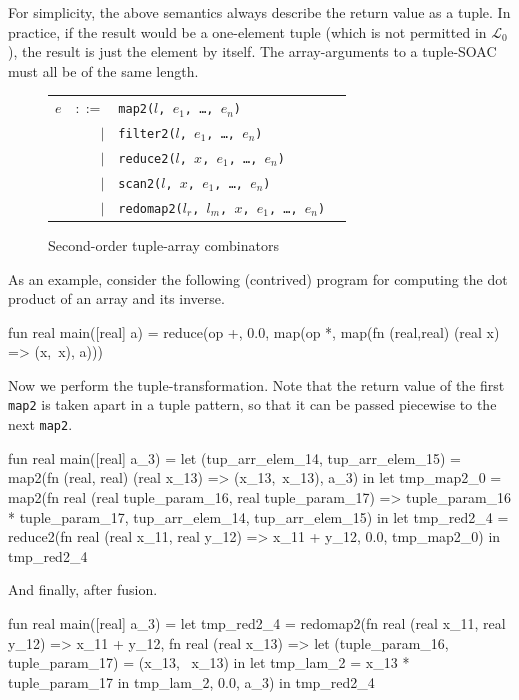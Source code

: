 \documentclass{sigplanconf}  %
\newcommand{\LO}{$\mathcal{L}_0$}
\begin{document}
For simplicity, the above semantics always describe the return value
as a tuple.  In practice, if the result would be a one-element tuple
(which is not permitted in \LO), the result is just the element by
itself.  The array-arguments to a tuple-SOAC must all be of the same
length.

\begin{figure}[bt]
\begin{tabular}{lrll}
$e$ & $::=$ & {\tt map2($l$, $e_{1}$, \ldots, $e_{n}$)} \\
    & $|$ & {\tt filter2($l$, $e_{1}$, \ldots, $e_{n}$)} \\
    & $|$ & {\tt reduce2($l$, $x$, $e_{1}$, \ldots, $e_{n}$)} \\
    & $|$ & {\tt scan2($l$, $x$, $e_{1}$, \ldots, $e_{n}$)} \\
    & $|$ & {\tt redomap2($l_{r}$, $l_{m}$, $x$, $e_{1}$, \ldots, $e_{n}$)} \\
\end{tabular}
\caption{Second-order tuple-array combinators}
\label{fig:tuple-soacs}
\end{figure}

As an example, consider the following (contrived) program for
computing the dot product of an array and its inverse.

\begin{colorcode}
fun real main([real] a) =
  reduce(op +, 0.0,
         map(op *,
             map(fn (real,real) (real x) => (x,~x),
                 a)))
\end{colorcode}
Now we perform the tuple-transformation.  Note that the return value
of the first {\tt map2} is taken apart in a tuple pattern, so that it
can be passed piecewise to the next {\tt map2}.
\begin{colorcode}
fun real main([real] a_3) =
  let (tup_arr_elem_14, tup_arr_elem_15) =
    map2(fn (real, real) (real x_13) =>
         (x_13,~x_13), a_3) in
  let tmp_map2_0 =
    map2(fn real (real tuple_param_16,
                  real tuple_param_17) =>
         tuple_param_16 * tuple_param_17,
         tup_arr_elem_14, tup_arr_elem_15) in
  let tmp_red2_4 =
    reduce2(fn real (real x_11, real y_12) =>
            x_11 + y_12, 0.0, tmp_map2_0) in
  tmp_red2_4
\end{colorcode}
And finally, after fusion.
\begin{colorcode}
fun real main([real] a_3) =
  let tmp_red2_4 =
    redomap2(fn real (real x_11, real y_12) => x_11 + y_12,
             fn real (real x_13) =>
             let (tuple_param_16, tuple_param_17) =
               (x_13, ~x_13) in
             let tmp_lam_2 = x_13 * tuple_param_17 in
             tmp_lam_2, 0.0, a_3) in
  tmp_red2_4
\end{colorcode}
\end{document}
